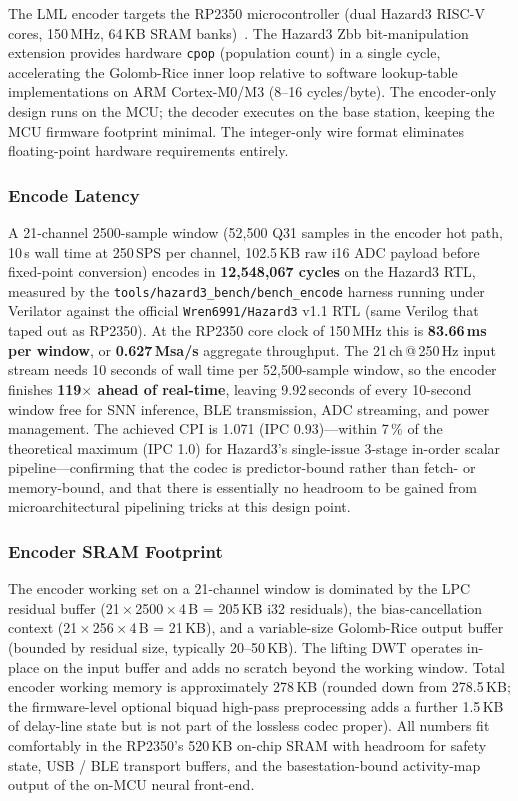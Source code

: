 \documentclass[journal]{IEEEtran}
\begin{document}
\vspace{0.4em}

The LML encoder targets the RP2350 microcontroller (dual Hazard3
RISC-V cores, 150\,MHz, 64\,KB SRAM banks)~\cite{rp2350_datasheet}.
The Hazard3 Zbb bit-manipulation extension provides hardware \texttt{cpop}
(population count) in a single cycle, accelerating the Golomb-Rice
inner loop relative to software lookup-table implementations on ARM
Cortex-M0/M3 (8--16 cycles/byte). The encoder-only design runs on
the MCU; the decoder executes on the base station, keeping the MCU
firmware footprint minimal. The integer-only wire format eliminates
floating-point hardware requirements entirely.

\subsubsection{Encode Latency}
A 21-channel 2500-sample window (52{,}500 Q31 samples in the
encoder hot path, 10\,s wall time at 250\,SPS per channel,
102.5\,KB raw i16 ADC payload before fixed-point conversion)
encodes in \textbf{12{,}548{,}067 cycles} on the Hazard3 RTL, measured by
the \texttt{tools/hazard3\_bench/bench\_encode} harness running
under Verilator against the official \texttt{Wren6991/Hazard3}
v1.1 RTL (same Verilog that taped out as RP2350). At the RP2350
core clock of 150\,MHz this is \textbf{83.66\,ms per window}, or
\textbf{0.627\,Msa/s} aggregate throughput. The 21\,ch\,@\,250\,Hz
input stream needs 10 seconds of wall time per 52{,}500-sample
window, so the encoder finishes \textbf{119{$\times$} ahead of
real-time}, leaving 9.92\,seconds of every 10-second window free
for SNN inference, BLE transmission, ADC streaming, and power
management. The achieved CPI is 1.071 (IPC 0.93)---within 7\,\% of the
theoretical maximum (IPC 1.0) for Hazard3's single-issue
3-stage in-order scalar pipeline---confirming that the codec
is predictor-bound rather than fetch- or memory-bound, and
that there is essentially no headroom to be gained from
microarchitectural pipelining tricks at this design point.

\subsubsection{Encoder SRAM Footprint}
The encoder working set on a 21-channel window is dominated by the
LPC residual buffer (21\,$\times$\,2500\,$\times$\,4\,B
= 205\,KB i32 residuals), the bias-cancellation context
(21\,$\times$\,256\,$\times$\,4\,B = 21\,KB), and a variable-size
Golomb-Rice output buffer (bounded by residual size, typically
20--50\,KB). The lifting DWT operates in-place on the input buffer
and adds no scratch beyond the working window. Total encoder
working memory is approximately 278\,KB (rounded down from
278.5\,KB; the firmware-level optional biquad high-pass
preprocessing adds a further 1.5\,KB of delay-line state but is
not part of the lossless codec proper). All numbers fit comfortably
in the RP2350's 520\,KB on-chip SRAM with headroom for safety state,
USB / BLE transport buffers, and the basestation-bound activity-map
output of the on-MCU neural front-end.
\end{document}
